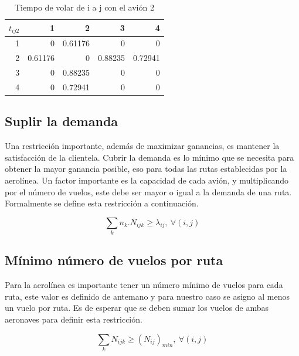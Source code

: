 \documentclass[12pt]{article}
\begin{document}
\begin{table}[ht!]
    \centering
    \begin{tabular}{r|r|r|r|r}
        $t_{ij2}$%
               &   1  &   2  &   3  &   4\\
            \hline
            \hline
             1 &       0  & 0.61176  &       0  &       0\\
             2 & 0.61176  &       0  & 0.88235  & 0.72941\\
             3 &       0  & 0.88235  &       0  &       0\\
             4 &       0  & 0.72941  &       0  &       0\\
    \end{tabular}
    \caption{Tiempo de volar de i a j con el avión 2}
    \label{tab:tij2}
\end{table}

\subsection{Suplir la demanda}

Una restricción importante, además de maximizar ganancias, es mantener la satisfacción de la clientela. Cubrir la demanda es lo mínimo que se necesita para obtener la mayor ganancia posible, eso para todas las rutas establecidas por la aerolínea. Un factor importante es la capacidad de cada avión, y multiplicando por el número de vuelos, este debe ser mayor o igual a la demanda de una ruta. Formalmente se define esta restricción a continuación.

\begin{equation}
    \sum_{k} n_{k}.N_{ijk} \geq \lambda_{ij},\ \forall (i,j)
\end{equation}

\subsection{Mínimo número de vuelos por ruta}

Para la aerolínea es importante tener un número mínimo de vuelos para cada ruta, este valor es definido de antemano y para nuestro caso se asigno al menos un vuelo por ruta. Es de esperar que se deben sumar los vuelos de ambas aeronaves para definir esta restricción.

\begin{equation}
    \sum_{k} N_{ijk} \geq (N_{ij})_{min},\ \forall (i,j)
\end{equation}
\end{document}
